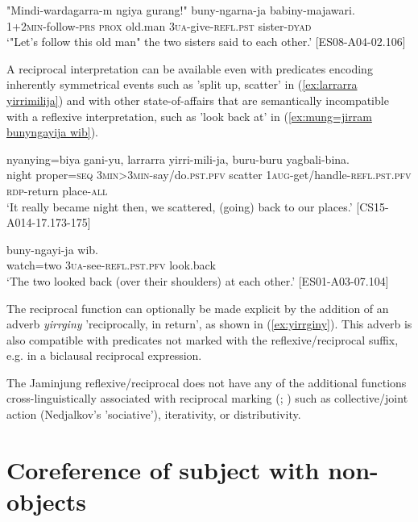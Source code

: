 \documentclass[output=paper,colorlinks,citecolor=brown]{langscibook}
\begin{document}
\ea
\gll "{Mindi-wardagarra-m} {ngiya} {gurang}!" {buny-ngarna-ja} {babiny-majawari}. \\
\textsc{1+2min}-follow-\textsc{prs}  \textsc{prox} old.man \textsc{3ua}-give-\textsc{refl.pst} sister-\textsc{dyad} \\
\glt `"Let's follow this old man" the two sisters said to each other.' [ES08-A04-02.106]
\label{ex:bunyngarnaja babiny-majawari}
\z

A reciprocal interpretation can be available even with predicates encoding inherently symmetrical events such as 'split up, scatter' in (\ref{ex:larrarra yirrimilija}) and with other state-of-affairs that are semantically incompatible with a reflexive interpretation, such as 'look back at' in (\ref{ex:mung=jirram bunyngayija wib}). 

\ea
{} {nyanying=biya} {gani-yu}, {larrarra} {yirri-mili-ja}, {buru-buru} {yagbali-bina}.\\
night proper=\textsc{seq} \textsc{3min>3min}-say/do.\textsc{pst.pfv} scatter \textsc{1aug}-get/handle-\textsc{refl.pst.pfv} \textsc{rdp}-return place-\textsc{all} \\
\glt `It really became night then, we scattered, (going) back to our places.' [CS15-A014-17.173-175]
\label{ex:larrarra yirrimilija}
\z

\ea
{} {buny-ngayi-ja} {wib}. \\
watch=two \textsc{3ua}-see-\textsc{refl.pst.pfv} look.back \\
\glt `The two looked back (over their shoulders) at each other.' [ES01-A03-07.104]
\label{ex:mung=jirram bunyngayija wib}
\z

The reciprocal function can optionally be made explicit by the addition of an adverb \textit{yirrginy} 'reciprocally, in return', as shown in (\ref{ex:yirrginy}). This adverb is  also compatible with predicates not marked with the reflexive/reciprocal suffix, e.g. in a biclausal reciprocal expression.

The Jaminjung reflexive/reciprocal does not have any of the additional functions cross-linguistically associated with reciprocal marking (\citealt{Nedjalkov2007Encoding}; \citealt[9]{KoenigGast2006}) such as collective/joint action (Nedjalkov's 'sociative'), iterativity, or distributivity.


\section{Coreference of subject with non-objects} \label{sec:SchultzeBernd:6}
\end{document}
